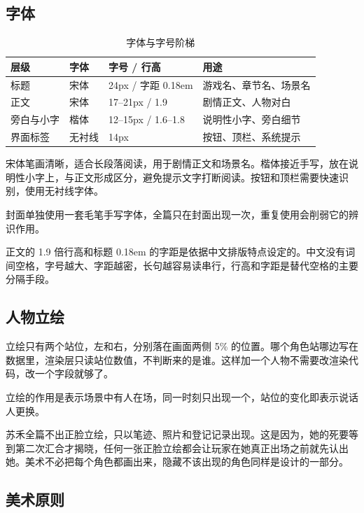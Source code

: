 \subsection{字体}

\begin{table}[htbp]
\centering
\caption{字体与字号阶梯}
\small
\begin{tabularx}{\linewidth}{@{}l l l X@{}}
\toprule
层级 & 字体 & 字号 / 行高 & 用途 \\
\midrule
标题 & 宋体 & 24px / 字距 0.18em & 游戏名、章节名、场景名 \\
正文 & 宋体 & 17--21px / 1.9 & 剧情正文、人物对白 \\
旁白与小字 & 楷体 & 12--15px / 1.6--1.8 & 说明性小字、旁白细节 \\
界面标签 & 无衬线 & 14px & 按钮、顶栏、系统提示 \\
\bottomrule
\end{tabularx}
\end{table}

宋体笔画清晰，适合长段落阅读，用于剧情正文和场景名。楷体接近手写，放在说明性小字上，与正文形成区分，避免提示文字打断阅读。按钮和顶栏需要快速识别，使用无衬线字体。

封面单独使用一套毛笔手写字体，全篇只在封面出现一次，重复使用会削弱它的辨识作用。

正文的 1.9 倍行高和标题 0.18em 的字距是依据中文排版特点设定的。中文没有词间空格，字号越大、字距越密，长句越容易读串行，行高和字距是替代空格的主要分隔手段。

\subsection{人物立绘}

立绘只有两个站位，左和右，分别落在画面两侧 5\% 的位置。哪个角色站哪边写在数据里，渲染层只读站位数值，不判断来的是谁。这样加一个人物不需要改渲染代码，改一个字段就够了。

立绘的作用是表示场景中有人在场，同一时刻只出现一个，站位的变化即表示说话人更换。

苏禾全篇不出正脸立绘，只以笔迹、照片和登记记录出现。这是因为，她的死要等到第二次汇合才揭晓，任何一张正脸立绘都会让玩家在她真正出场之前就先认出她。美术不必把每个角色都画出来，隐藏不该出现的角色同样是设计的一部分。

\subsection{美术原则}

